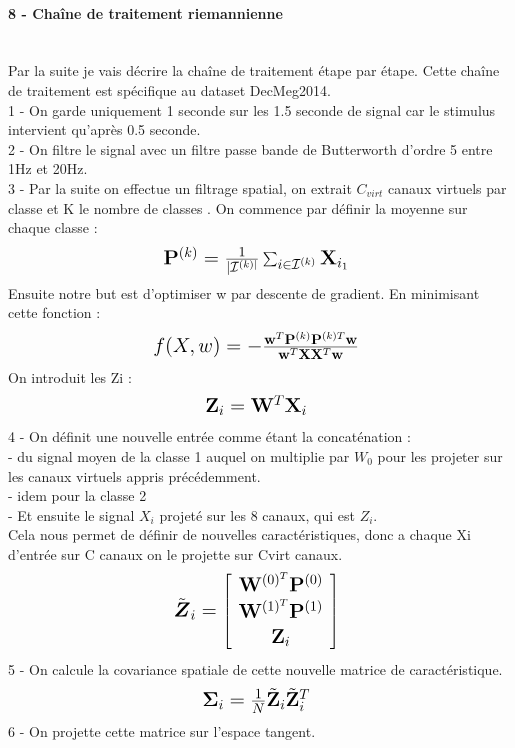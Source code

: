 \documentclass{article}[12pt]
\begin{document}
\paragraph{8 - Chaîne de traitement riemannienne}\mbox{}\\
Par la suite je vais décrire la chaîne de traitement étape par étape. Cette chaîne de traitement est spécifique au dataset DecMeg2014.\\
1 - On garde uniquement 1 seconde sur les 1.5 seconde de signal car le stimulus intervient qu’après 0.5 seconde. \\
2 - On filtre le signal avec un filtre passe bande de Butterworth d'ordre 5 entre 1Hz et 20Hz.\\
3 - Par la suite on effectue un filtrage spatial, on extrait $C_{virt}$ canaux virtuels par classe et K le nombre de classes \cite{rivet_xdawn_2009}. On commence par définir la moyenne sur chaque classe :
$$ \mbox{\Large $ 
\mathbf{P}^{(k)}=\frac{1}{ | \mathcal{I}^{(k) |}} \sum_{i \in \mathcal{I}^{(k)}} \mathbf{X}_{i_{1}}
$ } $$
Ensuite notre but est d'optimiser w par descente de gradient. En minimisant cette fonction :
$$ \mbox{\Large $ 
f(X,w)=- \frac{\mathbf{w}^{T} \mathbf{P}^{(k)} \mathbf{P}^{(k) T} \mathbf{w}}{\mathbf{w}^{T} \mathbf{X} \mathbf{X}^{T} \mathbf{w}}
$ } $$
On introduit les Zi :
$$ \mbox{\Large $ 
\mathbf{Z}_{i}=\mathbf{W}^{T} \mathbf{X}_{i}
$ } $$
4 - On définit une nouvelle entrée comme étant la concaténation :\\
- du signal moyen de la classe 1 auquel on multiplie par $W_{0}$ pour les projeter sur les canaux virtuels appris précédemment.\\
- idem pour la classe 2\\
- Et ensuite le signal $X_{i}$ projeté sur les 8 canaux, qui est $Z_{i}$.\\
Cela nous permet de définir de nouvelles caractéristiques, donc a chaque Xi d'entrée sur C canaux on le projette sur Cvirt canaux.
$$ \mbox{\Large $ 
\tilde{\boldsymbol{Z}}_{i}=\left[ \begin{array}{c}{\mathbf{W}^{(0)^{T}} \mathbf{P}^{(0)}} \\ {\mathbf{W}^{(1)^{T}} \mathbf{P}^{(1)}} \\ {\mathbf{Z}_{i}}\end{array}\right]
$ } $$
5 - On calcule la covariance spatiale de cette nouvelle matrice de caractéristique.
$$ \mbox{\Large $ 
\boldsymbol{\Sigma}_{i}=\frac{1}{N} \tilde{\mathbf{Z}}_{i} \tilde{\mathbf{Z}}_{i}^{T}
$ } $$
6 - On projette cette matrice sur l'espace tangent.\\
\end{document}
